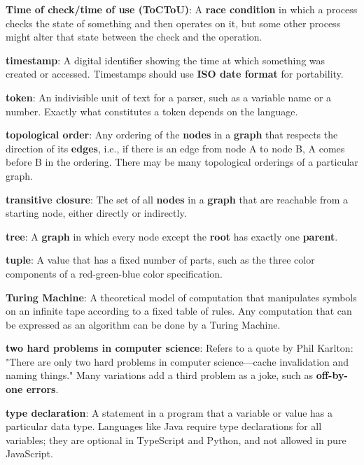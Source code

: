 \documentclass[krantzl]{krantz}
\newcommand{\glosskey}[1]{\textbf{#1}}
\begin{document}
\noindent \textbf{\glosskey{Time of check/time of use} (ToCToU)}: 
A \glosskey{race condition} in which a process checks the state of something and then operates on it, but some other process might alter that state between the check and the operation.


\noindent \textbf{\glosskey{timestamp}}: 
A digital identifier showing the time at which something was created or accessed. Timestamps should use \glosskey{ISO date format} for portability.


\noindent \textbf{\glosskey{token}}: 
An indivisible unit of text for a parser, such as a variable name or a number. Exactly what constitutes a token depends on the language.


\noindent \textbf{\glosskey{topological order}}: 
Any ordering of the \glosskey{nodes} in a \glosskey{graph} that respects the direction of its \glosskey{edges}, i.e., if there is an edge from node A to node B, A comes before B in the ordering. There may be many topological orderings of a particular graph.


\noindent \textbf{\glosskey{transitive closure}}: 
The set of all \glosskey{nodes} in a \glosskey{graph} that are reachable from a starting node, either directly or indirectly.


\noindent \textbf{\glosskey{tree}}: 
A \glosskey{graph} in which every node except the \glosskey{root} has exactly one \glosskey{parent}.


\noindent \textbf{\glosskey{tuple}}: 
A value that has a fixed number of parts, such as the three color components of a red-green-blue color specification.


\noindent \textbf{\glosskey{Turing Machine}}: 
A theoretical model of computation that manipulates symbols on an infinite tape according to a fixed table of rules. Any computation that can be expressed as an algorithm can be done by a Turing Machine.


\noindent \textbf{\glosskey{two hard problems in computer science}}: 
Refers to a quote by Phil Karlton: "There are only two hard problems in computer science—cache invalidation and naming things." Many variations add a third problem as a joke, such as \glosskey{off-by-one errors}.


\noindent \textbf{\glosskey{type declaration}}: 
A statement in a program that a variable or value has a particular data type. Languages like Java require type declarations for all variables; they are optional in TypeScript and Python, and not allowed in pure JavaScript.
\end{document}
